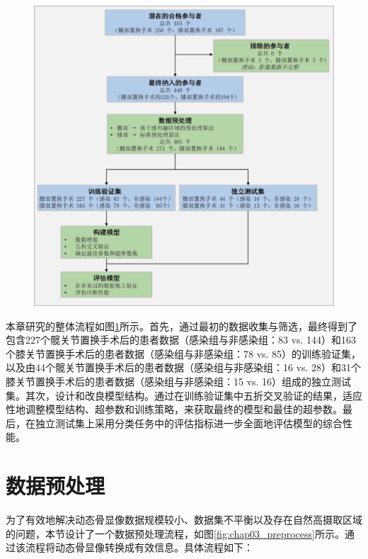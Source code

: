\begin{figure}[htbp]
  \centering
  \includegraphics[width=\textwidth]{figures/chap03_workflow.jpg}
  \label{fig:chap03_workflow}
\end{figure}

本章研究的整体流程如图\ref{fig:chap03_workflow}所示。首先，通过最初的数据收集与筛选，最终得到了包含227个髋关节置换手术后的患者数据（感染组与非感染组：83 vs. 144）和163个膝关节置换手术后的患者数据（感染组与非感染组：78 vs. 85）的训练验证集，以及由44个髋关节置换手术后的患者数据（感染组与非感染组：16 vs. 28）和31个膝关节置换手术后的患者数据（感染组与非感染组：15 vs. 16）组成的独立测试集。其次，设计和改良模型结构。通过在训练验证集中五折交叉验证的结果，适应性地调整模型结构、超参数和训练策略，来获取最终的模型和最佳的超参数。最后，在独立测试集上采用分类任务中的评估指标进一步全面地评估模型的综合性能。

\section{数据预处理}

为了有效地解决动态骨显像数据规模较小、数据集不平衡以及存在自然高摄取区域的问题，本节设计了一个数据预处理流程，如图\ref{fig:chap03_preprocess}所示。通过该流程将动态骨显像转换成有效信息。具体流程如下：


